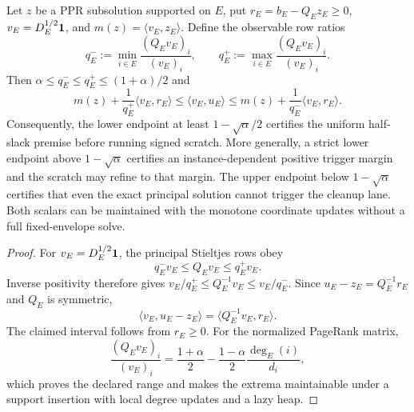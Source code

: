 \begin{proposition}
\label{prop:two-stage-mass-attempt-screen}
Let $z$ be a PPR subsolution supported on $E$, put
$r_E=b_E-Q_Ez_E\geq0$, $v_E=D_E^{1/2}\mathbf{1}$, and
$m(z)=\langle v_E,z_E\rangle$.  Define the observable row ratios
\begin{equation*}
 q_E^-:=\min_{i\in E}\frac{(Q_Ev_E)_i}{(v_E)_i},
 \qquad
 q_E^+:=\max_{i\in E}\frac{(Q_Ev_E)_i}{(v_E)_i}.
\end{equation*}
Then $\alpha\leq q_E^-\leq q_E^+\leq(1+\alpha)/2$ and
\begin{equation}
 m(z)+\frac1{q_E^+}\langle v_E,r_E\rangle
 \leq \langle v_E,u_E\rangle
 \leq m(z)+\frac1{q_E^-}\langle v_E,r_E\rangle.
 \label{eq:two-stage-mass-attempt-interval}
\end{equation}
Consequently, the lower endpoint at least
$1-\sqrt\alpha/2$ certifies the uniform half-slack premise before running
signed scratch.  More generally, a strict lower endpoint above
$1-\sqrt\alpha$ certifies an instance-dependent positive trigger margin and
the scratch may refine to that margin.  The upper endpoint below
$1-\sqrt\alpha$ certifies that even the exact principal solution cannot
trigger the cleanup lane.  Both scalars can be maintained with the monotone
coordinate updates without a full fixed-envelope solve.
\end{proposition}

\begin{proof}
For $v_E=D_E^{1/2}\mathbf{1}$, the principal Stieltjes rows obey
\begin{equation*}
 q_E^- v_E\leq Q_Ev_E\leq q_E^+ v_E.
\end{equation*}
Inverse positivity therefore gives
$v_E/q_E^+\leq Q_E^{-1}v_E\leq v_E/q_E^-$.  Since
$u_E-z_E=Q_E^{-1}r_E$ and $Q_E$ is symmetric,
\begin{equation*}
 \langle v_E,u_E-z_E\rangle
 =\langle Q_E^{-1}v_E,r_E\rangle.
\end{equation*}
The claimed interval follows from $r_E\geq0$.
For the normalized PageRank matrix,
\begin{equation*}
 \frac{(Q_Ev_E)_i}{(v_E)_i}
 =\frac{1+\alpha}{2}
  -\frac{1-\alpha}{2}\frac{\deg_E(i)}{d_i},
\end{equation*}
which proves the declared range and makes the extrema maintainable under a
support insertion with local degree updates and a lazy heap.
\end{proof}

